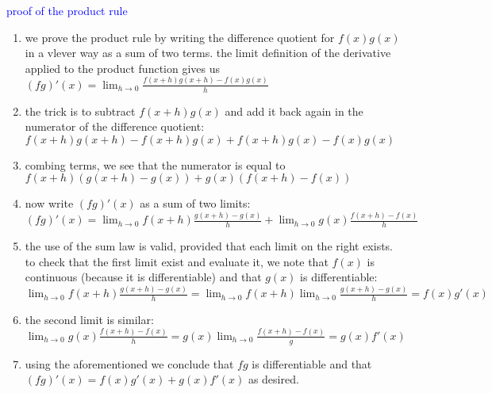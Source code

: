 \documentclass{article}
\begin{document}
\textcolor{blue}{proof of the product rule}
	\begin{enumerate}
		\item we prove the product rule by writing the difference quotient for $f(x)g(x)$ in a vlever way as a sum of two terms. the limit definition of the derivative applied to the product function gives us\\ $(fg)'(x) = \lim_{h \to 0}\frac{f(x + h)g(x + h) - f(x)g(x)}{h}$
		\item the trick is to subtract $f(x + h)g(x)$ and add it back again in the numerator of the difference quotient:\\ $f(x + h)g(x + h) - f(x + h)g(x) + f(x + h)g(x) - f(x)g(x)$
		\item combing terms, we see that the numerator is equal to\\ $f(x + h)(g(x + h) - g(x)) + g(x)(f(x + h) - f(x))$
		\item now write $(fg)'(x)$ as a sum of two limits: \\ $(fg)'(x) = \lim_{h \to 0}f(x + h)\frac{g(x + h) - g(x)}{h} + \lim_{h \to 0}g(x)\frac{f(x + h) - f(x)}{h}$
		\item the use of the sum law is valid, provided that each limit on the right exists. to check that the first limit exist and evaluate it, we note that $f(x)$ is continuous (because it is differentiable) and that $g(x)$ is differentiable:\\ $\lim_{h \to 0}f(x + h)\frac{g(x + h) - g(x)}{h} = \lim_{h \to 0}f(x + h)\lim_{h \to 0}\frac{g(x + h) - g(x)}{h} = f(x)g'(x)$
		\item the second limit is similar:\\ $\lim_{h \to 0}g(x)\frac{f(x + h) - f(x)}{h} = g(x)\lim_{h \to 0}\frac{f(x + h) - f(x)}{g} = g(x)f'(x)$
		\item using the aforementioned we conclude that $fg$ is differentiable and that $(fg)'(x) = f(x)g'(x) + g(x)f'(x)$ as desired.
	\end{enumerate}		
\end{document}
